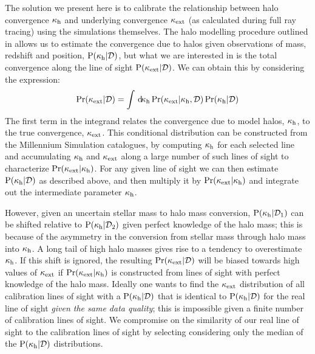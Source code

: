 \documentclass[useAMS,usenatbib,a4paper]{mn2e}
\begin{document}
The solution we present here is to calibrate the relationship between halo
convergence $\kappa_{\rm h}$ and underlying convergence $\kappa_{\rm ext}$ (as calculated
during full ray tracing) using the simulations themselves.
The halo modelling procedure outlined in  allows 
us to estimate 
the convergence due to halos given observations of 
mass, redshift and position,
${\rm P}(\kappa_{\rm h}|\mathcal{D})$, but what we are interested in is the total convergence
along the line of sight ${\rm P}(\kappa_{\rm ext}|\mathcal{D})$. We can obtain this by
considering the expression:
\begin{equation}
\Pr(\kappa_{\rm ext}|\mathcal{D}) = \int \, \mathrm{d} \!\kappa_{\rm h} 
   \Pr(\kappa_{\rm ext}|\kappa_{\rm h},\mathcal{D}) \Pr(\kappa_{\rm h}|\mathcal{D})
\label{eq:kappaconv}   
\end{equation}
The first term in the integrand relates the convergence due to model halos,
$\kappa_{\rm h}$, to the true convergence, $\kappa_{\rm ext}$. This conditional distribution
can be constructed from the Millennium Simulation catalogues, by computing
$\kappa_{\rm h}$ for each selected line and accumulating $\kappa_{\rm h}$ and $\kappa_{\rm ext}$ along a large number of
such lines of
sight to  characterize $\Pr(\kappa_{\rm ext}|\kappa_{\rm h})$.
For any given line of sight we can then estimate
${\rm P}(\kappa_{\rm h}|{\mathcal{D}})$ as described above, and then
multiply it by $\Pr(\kappa_{\rm ext}|\kappa_{\rm h})$ and integrate out the intermediate
parameter $\kappa_{\rm h}$. 

However, given an uncertain stellar mass to halo mass conversion,
${\rm P}(\kappa_{\rm h}|\mathcal{D}_1)$ can be shifted relative to
${\rm P}(\kappa_{\rm h}|\mathcal{D}_2)$ given perfect knowledge of the halo mass; this is because of the asymmetry in the
conversion from stellar mass through halo mass into $\kappa_{\rm h}$. A long tail of
high halo masses gives rise to a tendency to overestimate $\kappa_{\rm h}$.
If this shift is ignored, the resulting $\Pr(\kappa_{\rm ext}|{\mathcal{D}})$ will be 
biased towards high values of $\kappa_{\rm ext}$ if $\Pr(\kappa_{\rm ext}|\kappa_{\rm h})$ is constructed from lines
of sight with perfect knowledge of the halo mass. Ideally one wants to find the $\kappa_{\rm ext}$ distribution
of all calibration lines of sight with a ${\rm P}(\kappa_{\rm h}|{\mathcal{D}})$ that is identical to ${\rm P}(\kappa_{\rm h}|{\mathcal{D}})$ for the real line of sight
{\it given the same data quality}; this is impossible given a finite number of calibration lines of sight.
We compromise on the similarity of our real line of sight to the calibration lines of sight by 
selecting considering only the median of the ${\rm P}(\kappa_{\rm h}|{\mathcal{D}})$ distributions.
\end{document}
